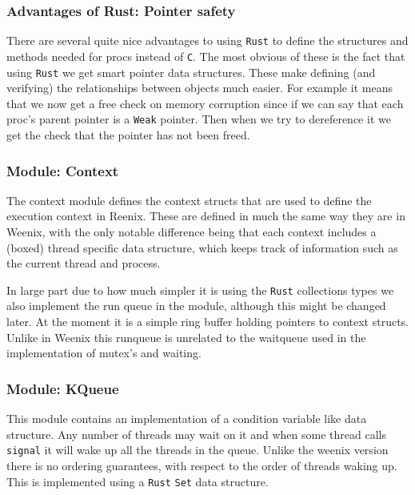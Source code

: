 \documentclass[12pt,letterpaper]{article}
\newcommand{\rust}{\texttt{Rust}}
\begin{document}
\subsubsection{Advantages of Rust: Pointer safety}
There are several quite nice advantages to using \rust{} to define the
structures and methods needed for procs instead of \texttt{C}. The most obvious
of these is the fact that using \rust{} we get smart pointer data structures.
These make defining (and verifying) the relationships between objects much
easier. For example it means that we now get a free check on memory corruption
since if we can say that each proc's parent pointer is a \texttt{Weak} pointer.
Then when we try to dereference it we get the check that the pointer has not
been freed.

\subsubsection{Module: Context}
The context module defines the context structs that are used to define
the execution context in Reenix. These are defined in much the same way
they are in Weenix, with the only notable difference being that each
context includes a (boxed) thread specific data structure, which keeps
track of information such as the current thread and process.

In large part due to how much simpler it is using the \rust{} collections
types we also implement the run queue in the module, although this
might be changed later. At the moment it is a simple ring buffer holding
pointers to context structs. Unlike in Weenix this runqueue is unrelated
to the waitqueue used in the implementation of mutex's and waiting.

\subsubsection{Module: KQueue}
This module contains an implementation of a condition variable like data
structure. Any number of threads may wait on it and when some thread calls
\texttt{signal} it will wake up all the threads in the queue. Unlike the
weenix version there is no ordering guarantees, with respect to the order
of threads waking up. This is implemented using a \rust{} \texttt{Set}
data structure.
\end{document}
